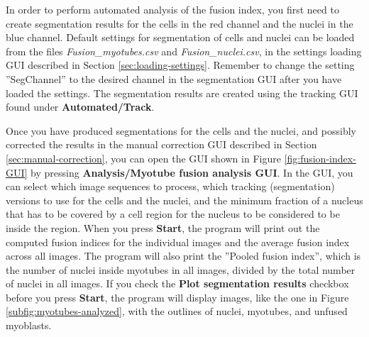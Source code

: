 \documentclass[a4paper, oneside, onecolumn, 11pt]{article}
\newcommand{\menu}[1]{\textbf{#1}}
\newcommand{\file}[1]{\emph{#1}}
\newcommand{\setting}[1]{''#1''}
\newcommand{\control}[1]{\textbf{#1}}
\begin{document}
In order to perform automated analysis of the fusion index, you first need to create segmentation results for the cells in the red channel and the nuclei in the blue channel. Default settings for segmentation of cells and nuclei can be loaded from the files \file{Fusion\_myotubes.csv} and \file{Fusion\_nuclei.csv}, in the settings loading GUI described in Section \ref{sec:loading-settings}. Remember to change the setting \setting{SegChannel} to the desired channel in the segmentation GUI after you have loaded the settings. The segmentation results are created using the tracking GUI found under \menu{Automated/\allowbreak Track}.

Once you have produced segmentations for the cells and the nuclei, and possibly corrected the results in the manual correction GUI described in Section \ref{sec:manual-correction}, you can open the GUI shown in Figure \ref{fig:fusion-index-GUI} by pressing \menu{Analysis/\allowbreak Myotube fusion analysis GUI}. In the GUI, you can select which image sequences to process, which tracking (segmentation) versions to use for the cells and the nuclei, and the minimum fraction of a nucleus that has to be covered by a cell region for the nucleus to be considered to be inside the region. When you press \control{Start}, the program will print out the computed fusion indices for the individual images and the average fusion index across all images. The program will also print the ''Pooled fusion index'', which is the number of nuclei inside myotubes in all images, divided by the total number of nuclei in all images. If you check the \control{Plot segmentation results} checkbox before you press \control{Start}, the program will display images, like the one in Figure \ref{subfig:myotubes-analyzed}, with the outlines of nuclei, myotubes, and unfused myoblasts.
\end{document}
